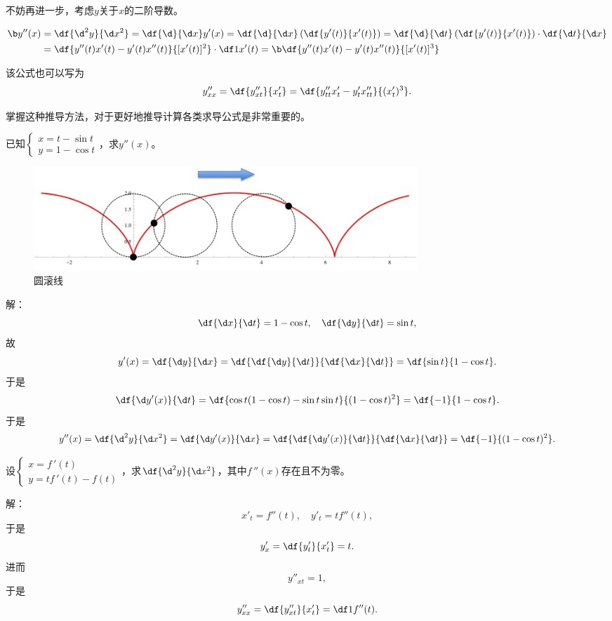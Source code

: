不妨再进一步，考虑$y$关于$x$的二阶导数。
\begin{thx}
	\begin{align*}
		{\b y''(x)}&=\df{\d^2y}{\d x^2}=\df{\d}{\d x}y'(x)
		=\df{\d}{\d x}\left(\df{y'(t)}{x'(t)}\right)
		=\df{\d}{\d t}\left(\df{y'(t)}{x'(t)}\right)\cdot\df{\d t}{\d x}\\
		&=\df{y''(t)x'(t)-y'(t)x''(t)}{[x'(t)]^2}\cdot\df1{x'(t)}
		={\b \df{y''(t)x'(t)-y'(t)x''(t)}{[x'(t)]^3}}
	\end{align*}
\end{thx}
该公式也可以写为
$$y''_{xx}=\df{y''_{xt}}{x'_t}=\df{y''_{tt}x'_t-y'_tx''_{tt}}
{(x'_t)^3}.$$

掌握这种推导方法，对于更好地推导计算各类求导公式是非常重要的。

\bs
\egz 已知$\left\{\begin{array}{l}x=t-\sin t\\
y=1-\cos t\end{array}\right.$，求$y''(x)$。

\begin{figure}[h]
	\centering
	\includegraphics[width=0.7\textwidth]
	{./Images/Ch02/sphereRoll.jpg}
	\caption{圆滚线}
	\label{fig:sphereRoll}
\end{figure}

解：
$$\df{\d x}{\d t}=1-\cos t,\quad \df{\d y}{\d t}=\sin t,$$
故
$$y'(x)=\df{\d y}{\d x}=\df{\df{\d y}{\d t}}{\df{\d x}{\d t}}
=\df{\sin t}{1-\cos t}.$$
于是
$$\df{\d y'(x)}{\d t}=\df{\cos t(1-\cos t)-\sin t\sin t}
{(1-\cos t)^2}=\df{-1}{1-\cos t}.$$
于是
$$y''(x)=\df{\d^2y}{\d x^2}=\df{\d y'(x)}{\d x}
=\df{\df{\d y'(x)}{\d t}}{\df{\d x}{\d t}}
=\df{-1}{(1-\cos t)^2}.$$
\fin

\bs
\egz 设$\left\{\begin{array}{l}x=f\,'(t)\\ y=tf\,'(t)-f(t)
\end{array}\right.$，求$\df{\d^2y}{\d x^2}$，其中$f\,''(x)$存在且不为零。

解：
$$x'_t=f''(t),\quad y'_t=tf''(t),$$
于是
$$y'_x=\df{y'_t}{x'_t}=t.$$
进而
$$y''_{xt}=1,$$
于是
$$y''_{xx}=\df{y''_{xt}}{x'_t}=\df1{f''(t)}.$$
\fin

